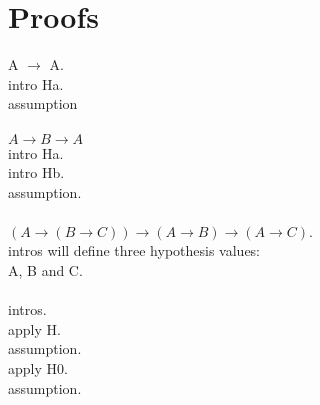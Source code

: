 \documentclass{article}
\begin{document}
\section{Proofs}
A $\rightarrow$ A.
\\
intro Ha.
\\
assumption
\\
\\
$A \rightarrow B \rightarrow A$
\\
intro Ha.
\\
intro Hb.
\\
assumption.
\\
\\
$(A \rightarrow (B \rightarrow C)) \rightarrow (A \rightarrow B) \rightarrow (A \rightarrow C)$.
\\
intros will define three hypothesis values: 
\\
A, B and C.
\\
\\
intros.
\\
apply H.
\\
assumption.
\\
apply H0.
\\
assumption.
\\
\\
\end{document}
